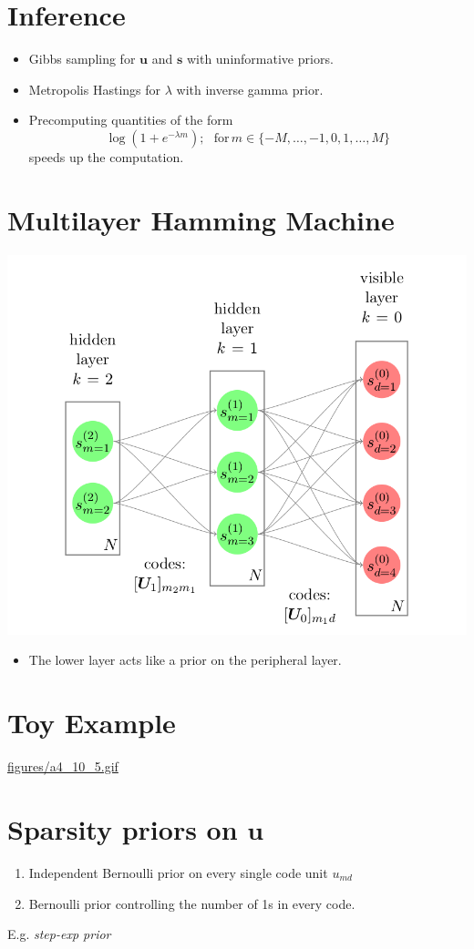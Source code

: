 \documentclass[11pt]{article}
\begin{document}
\section*{Inference}
\label{sec-3}
\begin{itemize}
\item Gibbs sampling for ${\mathbf{u}}$ and ${\mathbf{s}}$ with uninformative priors.
\item Metropolis Hastings for $\lambda$ with inverse gamma prior.
\item Precomputing quantities of the form $$ \log(1+e^{-\lambda m}); \,\,\,\, \text{for} \, m \in \{-M,\ldots,-1,0,1,\ldots,M\} $$ speeds up the computation.
\end{itemize}

\section*{Multilayer Hamming Machine}
\label{sec-4}
\includegraphics[width=.9\linewidth]{figures/hm2.png}
\begin{itemize}
\item The lower layer acts like a prior on the peripheral layer.
\end{itemize}

\section*{Toy Example}
\label{sec-5}
\url{figures/a4_10_5.gif}

\section*{Sparsity priors on ${\mathbf{u}}$}
\label{sec-6}
\begin{enumerate}
\item Independent Bernoulli prior on every single code unit ${u_{md}}$
\item Bernoulli prior controlling the number of 1s in every code.
\end{enumerate}
E.g. \emph{step-exp prior}
\end{document}
